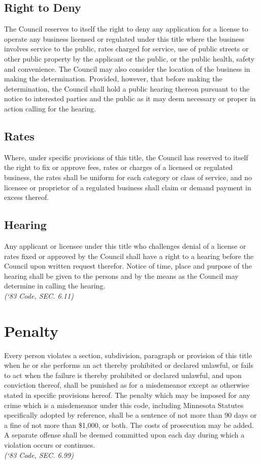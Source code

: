 \subsection{Right to Deny}
The Council reserves to itself the right to deny any application for a license to operate any business licensed or regulated under this title where the business involves service to the public, rates charged for service, use of public streets or other public property by the applicant or the public, or the public health, safety and convenience.  The Council may also consider the location of the business in making the determination.  Provided, however, that before making the determination, the Council shall hold a public hearing thereon pursuant to the notice to interested parties and the public as it may deem necessary or proper in action calling for the hearing.
\subsection{Rates}
Where, under specific provisions of this title, the Council has reserved to itself the right to fix or approve fees, rates or charges of a licensed or regulated business, the rates shall be uniform for each category or class of service, and no licensee or proprietor of a regulated business shall claim or demand payment in excess thereof.
\subsection{Hearing}
Any applicant or licensee under this title who challenges denial of a license or rates fixed or approved by the Council shall have a right to a hearing before the Council upon written request therefor.  Notice of time, place and purpose of the hearing shall be given to the persons and by the means as the Council may determine in calling the hearing.\\
\emph{(‘83 Code, SEC. 6.11)}

\setcounter{section}{98}
\section{Penalty}
Every person violates a section, subdivision, paragraph or provision of this title when he or she performs an act thereby prohibited or declared unlawful, or fails to act when the failure is thereby prohibited or declared unlawful, and upon conviction thereof, shall be punished as for a misdemeanor except as otherwise stated in specific provisions hereof.  The penalty which may be imposed for any crime which is a misdemeanor under this code, including Minnesota Statutes specifically adopted by reference, shall be a sentence of not more than 90 days or a fine of not more than \$1,000, or both.  The costs of prosecution may be added.  A separate offense shall be deemed committed upon each day during which a violation occurs or continues.\\
\emph{(‘83 Code, SEC. 6.99)}

%
